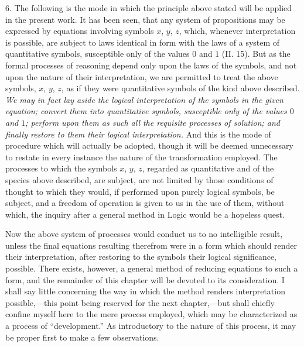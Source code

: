 \documentclass[oneside]{book}
\begin{document}
6. The following is the mode in which the principle above
stated will be applied in the present work. It has been seen,
that any system of propositions may be expressed by equations
involving symbols $x$, $y$, $z$, which, whenever interpretation is possible,
are subject to laws identical in form with the laws of a system
of quantitative symbols, susceptible only of the values $0$ and
$1$ (II. 15). But as the formal processes of reasoning depend only
upon the laws of the symbols, and not upon the nature of their
interpretation, we are permitted to treat the above symbols,
$x$, $y$, $z$, as if they were quantitative symbols of the kind above
described. \textit{We may in fact lay aside the logical interpretation of
the symbols in the given equation; convert them into quantitative symbols,
susceptible only of the values $0$ and $1$; perform upon them as such
all the requisite processes of solution; and finally restore to them their
logical interpretation.} And this is the mode of procedure which
will actually be adopted, though it will be deemed unnecessary
to restate in every instance the nature of the transformation employed.
The processes to which the symbols $x$, $y$, $z$, regarded
as quantitative and of the species above described, are subject, are
not limited by those conditions of thought to which they would,
if performed upon purely logical symbols, be subject, and a freedom of operation is given to us in the use of them, without
which, the inquiry after a general method in Logic would be a
hopeless quest.

Now the above system of processes would conduct us to no
intelligible result, unless the final equations resulting therefrom
were in a form which should render their interpretation, after
restoring to the symbols their logical significance, possible.
There exists, however, a general method of reducing equations
to such a form, and the remainder of this chapter will be devoted
to its consideration. I shall say little concerning the way in
which the method renders interpretation possible,---this point
being reserved for the next chapter,---but shall chiefly confine
myself here to the mere process employed, which may be characterized as a process of ``development.'' As introductory to
the nature of this process, it may be proper first to make a few
observations.
\end{document}
